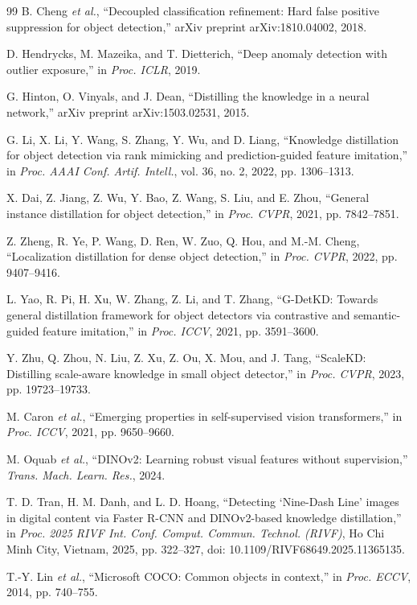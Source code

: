 \documentclass[conference,a4paper]{IEEEtran}
\begin{document}
\begin{thebibliography}{99}
B. Cheng \emph{et al.}, ``Decoupled classification refinement: Hard false positive suppression for object detection,'' arXiv preprint arXiv:1810.04002, 2018.

D. Hendrycks, M. Mazeika, and T. Dietterich, ``Deep anomaly detection with outlier exposure,'' in \emph{Proc. ICLR}, 2019.

G. Hinton, O. Vinyals, and J. Dean, ``Distilling the knowledge in a neural network,'' arXiv preprint arXiv:1503.02531, 2015.

G. Li, X. Li, Y. Wang, S. Zhang, Y. Wu, and D. Liang, ``Knowledge distillation for object detection via rank mimicking and prediction-guided feature imitation,'' in \emph{Proc. AAAI Conf. Artif. Intell.}, vol. 36, no. 2, 2022, pp. 1306--1313.

X. Dai, Z. Jiang, Z. Wu, Y. Bao, Z. Wang, S. Liu, and E. Zhou, ``General instance distillation for object detection,'' in \emph{Proc. CVPR}, 2021, pp. 7842--7851.

Z. Zheng, R. Ye, P. Wang, D. Ren, W. Zuo, Q. Hou, and M.-M. Cheng, ``Localization distillation for dense object detection,'' in \emph{Proc. CVPR}, 2022, pp. 9407--9416.

L. Yao, R. Pi, H. Xu, W. Zhang, Z. Li, and T. Zhang, ``G-DetKD: Towards general distillation framework for object detectors via contrastive and semantic-guided feature imitation,'' in \emph{Proc. ICCV}, 2021, pp. 3591--3600.

Y. Zhu, Q. Zhou, N. Liu, Z. Xu, Z. Ou, X. Mou, and J. Tang, ``ScaleKD: Distilling scale-aware knowledge in small object detector,'' in \emph{Proc. CVPR}, 2023, pp. 19723--19733.

M. Caron \emph{et al.}, ``Emerging properties in self-supervised vision transformers,'' in \emph{Proc. ICCV}, 2021, pp. 9650--9660.

M. Oquab \emph{et al.}, ``DINOv2: Learning robust visual features without supervision,'' \emph{Trans. Mach. Learn. Res.}, 2024.

T. D. Tran, H. M. Danh, and L. D. Hoang, ``Detecting `Nine-Dash Line' images in digital content via Faster R-CNN and DINOv2-based knowledge distillation,'' in \emph{Proc. 2025 RIVF Int. Conf. Comput. Commun. Technol. (RIVF)}, Ho Chi Minh City, Vietnam, 2025, pp. 322--327, doi: 10.1109/RIVF68649.2025.11365135.

T.-Y. Lin \emph{et al.}, ``Microsoft COCO: Common objects in context,'' in \emph{Proc. ECCV}, 2014, pp. 740--755.

\end{thebibliography}
\end{document}
